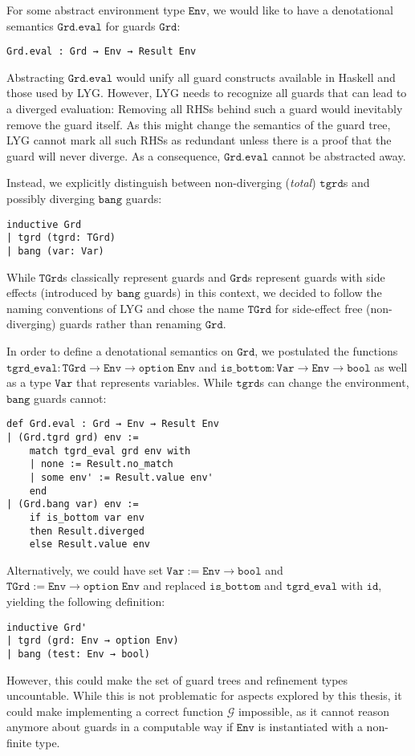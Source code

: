 For some abstract environment type $\mathtt{Env}$, we would like to have a denotational semantics $\mathtt{Grd.eval}$ for guards $\mathtt{Grd}$:
\begin{verbatim}
Grd.eval : Grd → Env → Result Env
\end{verbatim}

Abstracting $\mathtt{Grd.eval}$ would unify all guard constructs available in Haskell and those used by LYG.
However, LYG needs to recognize all guards that can lead to a diverged evaluation:
Removing all RHSs behind such a guard would inevitably remove the guard itself.
As this might change the semantics of the guard tree, LYG cannot mark all such RHSs as redundant unless there is a proof that the guard will never diverge.
As a consequence, $\mathtt{Grd.eval}$ cannot be abstracted away.

Instead, we explicitly distinguish between non-diverging (\textit{total}) $\mathtt{tgrd}$s and possibly diverging $\mathtt{bang}$ guards:
\begin{verbatim}
inductive Grd
| tgrd (tgrd: TGrd)
| bang (var: Var)
\end{verbatim}

While $\mathtt{TGrd}$s classically represent guards and $\mathtt{Grd}$s represent guards with side effects (introduced by $\mathtt{bang}$ guards) in this context,
we decided to follow the naming conventions of LYG and chose the name $\mathtt{TGrd}$ for side-effect free (non-diverging) guards
rather than renaming $\mathtt{Grd}$.

In order to define a denotational semantics on $\mathtt{Grd}$, we postulated the functions $\mathtt{tgrd\_eval}: \mathtt{TGrd} \to \mathtt{Env} \to \mathtt{option}\;\mathtt{Env}$ and $\mathtt{is\_bottom}: \mathtt{Var} \to \mathtt{Env} \to \mathtt{bool}$ as well as a type $\mathtt{Var}$ that represents variables. While $\mathtt{tgrd}$s can change the environment,
$\mathtt{bang}$ guards cannot:

\begin{verbatim}
def Grd.eval : Grd → Env → Result Env
| (Grd.tgrd grd) env :=
    match tgrd_eval grd env with
    | none := Result.no_match
    | some env' := Result.value env'
    end
| (Grd.bang var) env :=
    if is_bottom var env
    then Result.diverged
    else Result.value env
\end{verbatim}

Alternatively,
we could have set $\mathtt{Var} := \mathtt{Env} → \mathtt{bool}$ and $\mathtt{TGrd} := \mathtt{Env} → \mathtt{option}\;\mathtt{Env}$ and replaced $\mathtt{is\_bottom}$ and $\mathtt{tgrd\_eval}$ with $\mathtt{id}$,
yielding the following definition:
\begin{verbatim}
inductive Grd'
| tgrd (grd: Env → option Env)
| bang (test: Env → bool)
\end{verbatim}
However, this could make the set of guard trees and refinement types uncountable.
While this is not problematic for aspects explored by this thesis,
it could make implementing a correct function $\mathcal{G}$ impossible, as it cannot reason anymore about guards in a computable way if $\mathtt{Env}$ is instantiated with a non-finite type.

